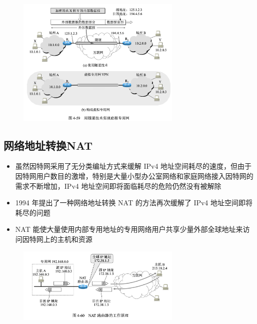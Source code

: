 \documentclass[cs4size,a4paper,10pt]{ctexart}
\begin{document}
	\begin{figure}[H]
		\centering
		\includegraphics[width=0.7\textwidth]{img/4.59}
	\end{figure}

	\subsection{网络地址转换NAT}
	\begin{itemize}
		\item 虽然因特网采用了无分类编址方式来缓解 IPv4 地址空间耗尽的速度，但由于因特网用户数目的激增，特别是大量小型办公室网络和家庭网络接入因特网的需求不断增加，IPv4 地址空间即将面临耗尽的危险仍然没有被解除
		\item 1994 年提出了一种网络地址转换 NAT 的方法再次缓解了 IPv4 地址空间即将耗尽的问题
		\item NAT 能使大量使用内部专用地址的专用网络用户共享少量外部全球地址来访问因特网上的主机和资源
	\end{itemize}

	\begin{figure}[H]
		\centering
		\includegraphics[width=0.7\textwidth]{img/4.60}
	\end{figure}
\end{document}
